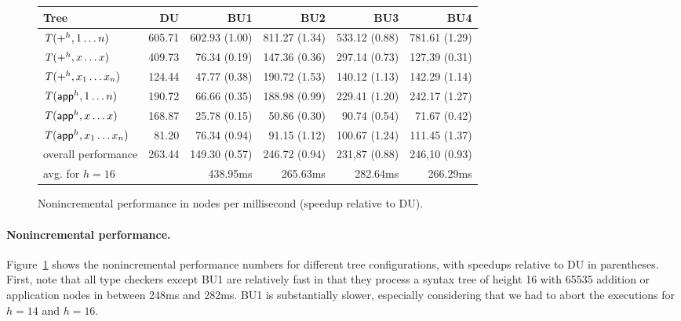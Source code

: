 \documentclass{llncs}
\begin{document}
\begin{figure}[t]
  \centering
  \begin{tabular}[t]{l@{\hskip.5em}r@{\hskip1em}r@{\hskip1em}r@{\hskip1em}r@{\hskip1em}r}
    \toprule
    Tree & DU & BU1 & BU2 & BU3 & BU4 \\
    \midrule
    {\scriptsize$\mathit{T}({+}^{h},1 \ldots n)$}      &  605.71  & 602.93 (1.00)  & 811.27 (1.34)  & 533.12 (0.88)  &  781.61 (1.29) \\
    {\scriptsize$\mathit{T}({+}^{h},x \ldots x)$}      &  409.73  & 76.34  (0.19)  & 147.36 (0.36)  & 297.14 (0.73)  &  127,39 (0.31) \\
    {\scriptsize$\mathit{T}({+}^{h},x_1 \ldots x_n)$}  &  124.44  & 47.77  (0.38)  & 190.72 (1.53)  & 140.12 (1.13)  &  142.29 (1.14) \\
    \midrule                          
    {\scriptsize$\mathit{T}({\textsf{app}}^{h},1 \ldots n)$}      &  190.72  & 66.66 (0.35)  & 188.98 (0.99)  & 229.41 (1.20) &  242.17 (1.27) \\
    {\scriptsize$\mathit{T}({\textsf{app}}^{h},x \ldots x)$}      &  168.87  & 25.78 (0.15)  &  50.86 (0.30)  &  90.74 (0.54) &  71.67 (0.42)  \\
    {\scriptsize$\mathit{T}({\textsf{app}}^{h},x_1 \ldots x_n)$}  &   81.20  & 76.34 (0.94)  &  91.15 (1.12)  & 100.67 (1.24) &  111.45 (1.37) \\
    \midrule
    {\scriptsize overall performance} & 263.44 & 149.30 (0.57) & 246.72 (0.94) & 231,87 (0.88) & 246,10 (0.93) \\
    {\scriptsize avg. for $h=16$} & \hskip-.5em 248.77ms & 438.95ms & 265.63ms & 282.64ms & 266.29ms \\
    \bottomrule
  \end{tabular}
  \caption{Nonincremental performance in nodes per millisecond (speedup relative to DU).}
  \label{fig:performance:nonincremental}
\end{figure}

\paragraph{Nonincremental performance.}
Figure~\ref{fig:performance:nonincremental} shows the nonincremental performance
numbers for different tree configurations, with speedups relative to DU in
parentheses. First, note that all type checkers except BU1 are relatively
fast in that they process a syntax tree of height 16 with 65535 addition or
application nodes in between 248ms and 282ms. BU1 is substantially slower,
especially considering that we had to abort the executions for $h=14$ and $h=16$.
\end{document}
